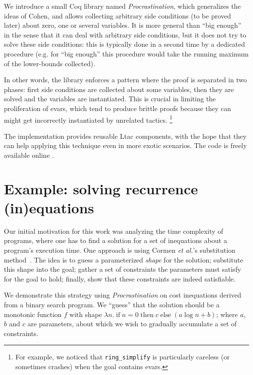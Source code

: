 \documentclass[xetex,format=acmlarge,screen=true,authorversion=true]{acmart-modified}
\begin{document}
We introduce a small Coq library named \emph{Procrastination}, which generalizes
the ideas of Cohen, and allows collecting arbitrary side conditions (to be
proved later) about zero, one or several variables. It is more general than
``big enough'' in the sense that it can deal with arbitrary side conditions, but
it does not try to solve these side conditions: this is typically done in a
second time by a dedicated procedure (e.g. for ``big enough'' this procedure
would take the running maximum of the lower-bounds collected).

In other words, the library enforces a pattern where the proof is separated in
two phases: first side conditions are collected about some variables, then they
are solved and the variables are instantiated. This is crucial in limiting the
proliferation of evars, which tend to produce brittle proofs because they can
might get incorrectly instantiated by unrelated tactics.
 \footnote{For example, we noticed that \texttt{ring\_simplify} is
   particularly careless (or sometimes crashes)
   when the goal contains evars.}

The implementation provides reusable Ltac components, with the hope that they
can help applying this technique even in more exotic scenarios. The code is
freely available online \cite{procrastination}.

\section{Example: solving recurrence (in)equations}
\label{sec:example1}

Our initial motivation for this work was analyzing the time complexity of
programs, where one has to find a solution for a set of inequations about a
program's execution time.
%
%
One approach is using Cormen \emph{et al.}'s substitution
method~\cite[\S4]{cormen-en}. The idea is to guess a parameterized \emph{shape}
for the solution; substitute this shape into the goal; gather a set of
constraints the parameters must satisfy for the goal to hold; finally, show that
these constraints are indeed satisfiable.

We demonstrate this strategy using \emph{Procrastination} on cost inequations
derived from a binary search program. We ``guess'' that the solution should be a
monotonic function $f$ with shape
%
%
$\lambda n. \; \text{if} \; n = 0 \; \text{then} \; c \; \text{else} \; (a \log{n} + b)$;
%
where $a$, $b$ and $c$ are parameters, about which we wish to gradually
accumulate a set of constraints.
\end{document}
